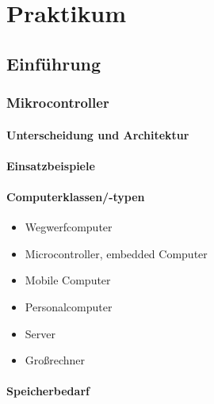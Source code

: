 \part{Praktikum}

\chapter{Einführung}
\section{Mikrocontroller}
\subsection{Unterscheidung und Architektur}

\subsection{Einsatzbeispiele}
\subsection*{Computerklassen/-typen}
\begin{itemize}
\item Wegwerfcomputer
\item Microcontroller, embedded Computer
\item Mobile Computer
\item Personalcomputer
\item Server
\item Großrechner
\end{itemize}

\subsection{Speicherbedarf}

